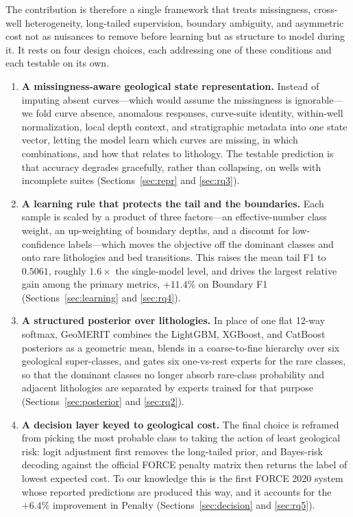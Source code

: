 \documentclass[bdcc,article,submit,pdftex,moreauthors]{Definitions/mdpi}
\begin{document}
The contribution is therefore a single framework that treats missingness, cross-well
heterogeneity, long-tailed supervision, boundary ambiguity, and asymmetric cost not as
nuisances to remove before learning but as structure to model during it. It rests on four
design choices, each addressing one of these conditions and each testable on its own.
\begin{enumerate}
\item \textbf{A missingness-aware geological state representation.} Instead of imputing absent
curves---which would assume the missingness is ignorable---we fold curve absence, anomalous
responses, curve-suite identity, within-well normalization, local depth context, and
stratigraphic metadata into one state vector, letting the model learn which curves are missing,
in which combinations, and how that relates to lithology. The testable prediction is that
accuracy degrades gracefully, rather than collapsing, on wells with incomplete suites
(Sections~\ref{sec:repr} and \ref{sec:rq3}).
\item \textbf{A learning rule that protects the tail and the boundaries.} Each sample is scaled
by a product of three factors---an effective-number class weight, an up-weighting of boundary
depths, and a discount for low-confidence labels---which moves the objective off the dominant
classes and onto rare lithologies and bed transitions. This raises the mean tail F1 to
$0.5061$, roughly $1.6\times$ the single-model level, and drives the largest relative gain
among the primary metrics, $+11.4\%$ on Boundary F1 (Sections~\ref{sec:learning} and
\ref{sec:rq4}).
\item \textbf{A structured posterior over lithologies.} In place of one flat 12-way softmax,
GeoMERIT combines the LightGBM, XGBoost, and CatBoost posteriors as a geometric mean, blends in
a coarse-to-fine hierarchy over six geological super-classes, and gates six one-vs-rest experts
for the rare classes, so that the dominant classes no longer absorb rare-class probability and
adjacent lithologies are separated by experts trained for that purpose
(Sections~\ref{sec:posterior} and \ref{sec:rq2}).
\item \textbf{A decision layer keyed to geological cost.} The final choice is reframed from
picking the most probable class to taking the action of least geological risk: logit adjustment
first removes the long-tailed prior, and Bayes-risk decoding against the official FORCE penalty
matrix then returns the label of lowest expected cost. To our knowledge this is the first
FORCE 2020 system whose reported predictions are produced this way, and it accounts for the
$+6.4\%$ improvement in Penalty (Sections~\ref{sec:decision} and \ref{sec:rq5}).
\end{enumerate}
\end{document}
